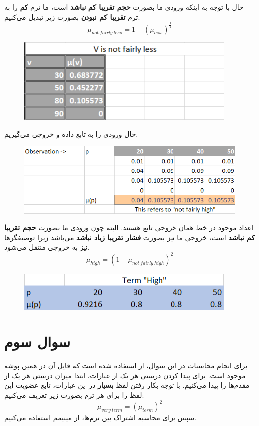 \documentclass[12pt]{report}
\begin{document}
	حال با توجه به اینکه ورودی ما بصورت \textbf{حجم تقریبا کم نباشد} است، ما ترم \textbf{کم} را به ترم \textbf{تقریبا کم نبودن} بصورت زیر تبدیل می‌کنیم.
	\begin{equation}
		\mu_{not\ fairly\ less} = 1 - (\mu_{less})^{\frac{1}{2}}
	\end{equation}
	\begin{figure}[H]
		\centering
		\includegraphics[scale=0.8]{pic_3}
	\end{figure}
	حال ورودی را به تابع  داده و خروجی می‌گیریم.
	\begin{figure}[H]
		\centering
		\includegraphics[scale=0.8]{pic_4}
	\end{figure}
	اعداد موجود در خط  همان خروجی تابع هستند.
	البته چون ورودی ما بصورت \textbf{حجم تقریبا کم نباشد} است، خروجی ما نیز بصورت \textbf{فشار تقریبا زیاد نباشد} می‌باشد زیرا توصیفگرها نیز به خروجی منتقل می‌شود. 
	\begin{equation}
		\mu_{high} = (1 - \mu_{not\ fairly\ high})^{2}
	\end{equation}
	\begin{figure}[H]
		\centering
		\includegraphics[scale=0.8]{pic_5}
	\end{figure}
	\section{سوال سوم}
		برای انجام محاسبات در این سوال، از  استفاده شده است که فایل آن در همین پوشه موجود است.
	\newline
	برای پیدا کردن درستی هر یک از عبارات، ابتدا میزان درستی هر یک از مقدم‌ها را پیدا می‌کنیم. با توجه بکار رفتن لفظ \textbf{بسیار} در این عبارات، تابع عضویت این لفظ را  برای هر ترم  بصورت زیر تعریف می‌کنیم:
	\begin{equation}
		\mu_{very\ term} = (\mu_{term})^{2}
	\end{equation}
	سپس برای محاسبه اشتراک  بین ترم‌ها، از مینیمم استفاده می‌کنیم.
	
\end{document}
